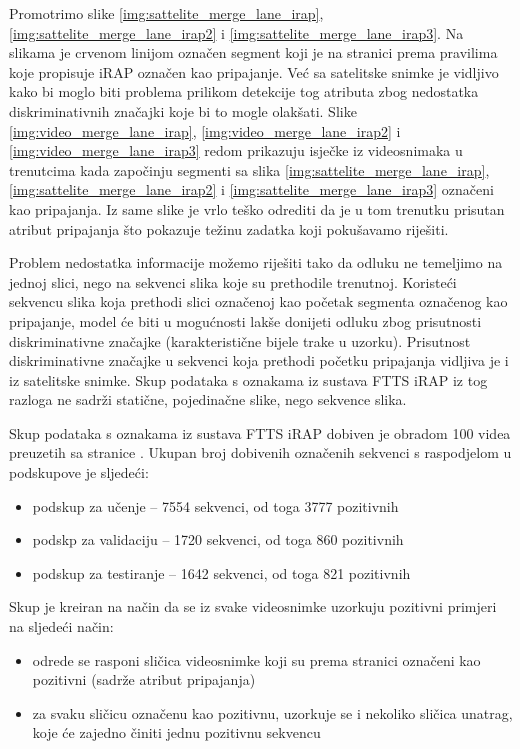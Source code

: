 \documentclass[times, utf8, diplomski, numeric]{fer}
\begin{document}
Promotrimo slike \ref{img:sattelite_merge_lane_irap}, \ref{img:sattelite_merge_lane_irap2} i \ref{img:sattelite_merge_lane_irap3}. Na slikama je crvenom linijom označen segment koji je na stranici \citep{url:ftts_irap} prema pravilima koje propisuje iRAP označen kao pripajanje. 
Već sa satelitske snimke je vidljivo kako bi moglo biti problema prilikom detekcije tog atributa zbog nedostatka diskriminativnih značajki koje bi to mogle olakšati.
Slike \ref{img:video_merge_lane_irap}, \ref{img:video_merge_lane_irap2} i \ref{img:video_merge_lane_irap3} redom prikazuju isječke iz videosnimaka u trenutcima kada započinju segmenti sa slika \ref{img:sattelite_merge_lane_irap}, \ref{img:sattelite_merge_lane_irap2} i \ref{img:sattelite_merge_lane_irap3} označeni kao pripajanja. 
Iz same slike je vrlo teško odrediti da je u tom trenutku prisutan atribut pripajanja što pokazuje težinu zadatka koji pokušavamo riješiti.

Problem nedostatka informacije možemo riješiti tako da odluku ne temeljimo na jednoj slici, nego na sekvenci slika koje su prethodile trenutnoj. 
Koristeći sekvencu slika koja prethodi slici označenoj kao početak segmenta označenog kao pripajanje, model će biti u mogućnosti lakše donijeti odluku zbog prisutnosti diskriminativne značajke (karakteristične bijele trake u uzorku).
Prisutnost diskriminativne značajke u sekvenci koja prethodi početku pripajanja vidljiva je i iz satelitske snimke.
Skup podataka s oznakama iz sustava FTTS iRAP iz tog razloga ne sadrži statične, pojedinačne slike, nego sekvence slika.

Skup podataka s oznakama iz sustava FTTS iRAP dobiven je obradom 100 videa preuzetih sa stranice \citep{url:ftts_irap}. 
Ukupan broj dobivenih označenih sekvenci s raspodjelom u podskupove je sljedeći:
\begin{itemize}
 \item podskup za učenje -- 7554 sekvenci, od toga 3777 pozitivnih
 \item podskp za validaciju -- 1720 sekvenci, od toga 860 pozitivnih
 \item podskup za testiranje -- 1642 sekvenci, od toga 821 pozitivnih
\end{itemize}

\noindent Skup je kreiran na način da se iz svake videosnimke uzorkuju pozitivni primjeri na sljedeći način: 
\begin{itemize}
 \item odrede se rasponi sličica videosnimke koji su prema stranici \citep{url:ftts_irap} označeni kao pozitivni (sadrže atribut pripajanja)
 \item za svaku sličicu označenu kao pozitivnu, uzorkuje se i nekoliko sličica unatrag, koje će zajedno činiti jednu pozitivnu sekvencu
\end{itemize}
\end{document}
